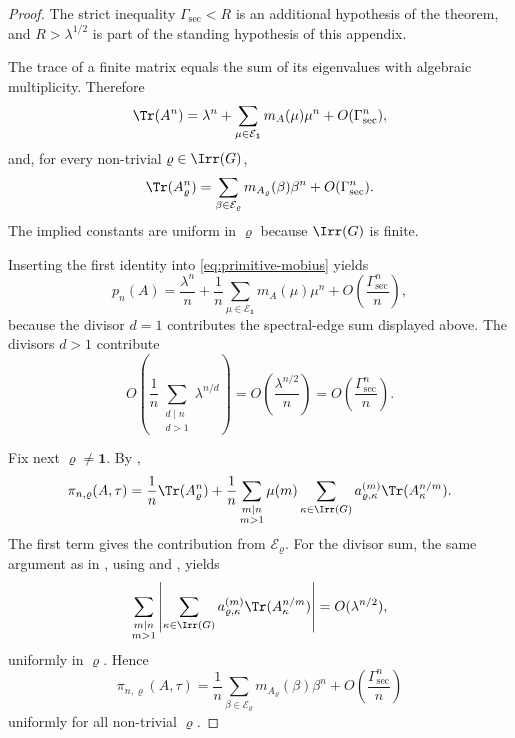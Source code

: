 \begin{proof}
  The strict inequality \(\Gamma_{\mathrm{sec}}<R\) is an additional
  hypothesis of the theorem, and \(R>\lambda^{1/2}\) is part of the standing
  hypothesis of this appendix.

  The trace of a finite matrix equals the sum of its eigenvalues with
  algebraic multiplicity. Therefore
  \[
    \Tr(A^n)
    =
    \lambda^n
    +\sum_{\mu\in\mathcal E_{\mathbf 1}}m_A(\mu)\mu^n
    +O(\Gamma_{\mathrm{sec}}^n),
  \]
  and, for every non-trivial \(\varrho\in\Irr(G)\),
  \[
    \Tr(A_\varrho^n)
    =
    \sum_{\beta\in\mathcal E_\varrho}m_{A_\varrho}(\beta)\beta^n
    +O(\Gamma_{\mathrm{sec}}^n).
  \]
  The implied constants are uniform in \(\varrho\) because \(\Irr(G)\)
  is finite.

  Inserting the first identity into \eqref{eq:primitive-mobius} yields
  \[
    p_n(A)
    =
    \frac{\lambda^n}{n}
    +\frac{1}{n}\sum_{\mu\in\mathcal E_{\mathbf 1}}m_A(\mu)\mu^n
    +O\!\left(\frac{\Gamma_{\mathrm{sec}}^n}{n}\right),
  \]
  because the divisor \(d=1\) contributes the spectral-edge sum displayed
  above. The divisors \(d>1\) contribute
  \[
    O\!\left(
      \frac{1}{n}\sum_{\substack{d\mid n\\ d>1}}\lambda^{n/d}
    \right)
    =
    O\!\left(\frac{\lambda^{n/2}}{n}\right)
    =
    O\!\left(\frac{\Gamma_{\mathrm{sec}}^n}{n}\right).
  \]

  Fix next \(\varrho\neq\mathbf 1\). By
  ,
  \[
    \pi_{n,\varrho}(A,\tau)
    =
    \frac{1}{n}\Tr(A_\varrho^n)
    +\frac{1}{n}
      \sum_{\substack{m\mid n\\ m>1}}\mu(m)
        \sum_{\kappa\in\Irr(G)}
          a_{\varrho,\kappa}^{(m)}\Tr(A_\kappa^{n/m}).
  \]
  The first term gives the contribution from \(\mathcal E_\varrho\). For
  the divisor sum, the same argument as in
  , using
   and
  , yields
  \[
    \sum_{\substack{m\mid n\\ m>1}}
      \left|
        \sum_{\kappa\in\Irr(G)}
          a_{\varrho,\kappa}^{(m)}\Tr(A_\kappa^{n/m})
      \right|
    =
    O(\lambda^{n/2}),
  \]
  uniformly in \(\varrho\). Hence
  \[
    \pi_{n,\varrho}(A,\tau)
    =
    \frac{1}{n}
      \sum_{\beta\in\mathcal E_\varrho}m_{A_\varrho}(\beta)\beta^n
    +O\!\left(\frac{\Gamma_{\mathrm{sec}}^n}{n}\right)
  \]
  uniformly for all non-trivial \(\varrho\).


\end{proof}
